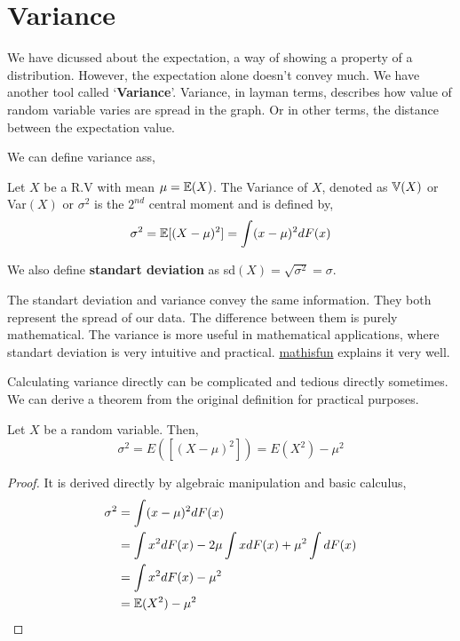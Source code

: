 \section{Variance}
We have dicussed about the expectation, a way of showing a property of a distribution. However, the expectation alone doesn't convey much. We have another tool called `\textbf{Variance}'.
Variance, in layman terms, describes how value of random variable varies are spread in the graph. Or in other terms, the distance between the expectation value. 
\par

We can define variance ass,
\begin{definition}
    Let $X$ be a R.V with mean $\mu = {\mathbb{E}}(X)$. The Variance of $X$, denoted as ${\mathbb{V}}(X)$ or  Var$(X)$ or $\sigma ^2$ is the $2^{nd}$ central moment and is defined by,
    \[ \sigma^2 = {\mathbb{E}} [(X- \mu)^2] = \int (x -\mu)^2 dF(x)\]
    
    We also define \textbf{standart deviation} as sd$(X) = \sqrt{\sigma^2}= \sigma$.
\end{definition}
The standart deviation and variance convey the same information. They both represent the spread of our data. 
The difference between them is purely mathematical. The variance is more useful in mathematical applications, where standart deviation is very intuitive and practical. 
\href{https://www.mathsisfun.com/data/standard-deviation.html}{mathisfun} explains it very well.
\par
Calculating variance directly can be complicated  and tedious directly sometimes. We can derive a theorem from the original definition for practical purposes.
\begin{theorem}
    Let $X$ be a random variable. Then,
    \[\sigma^2 = E([ (X-\mu)^2]) = E(X^2) - \mu^2\]
    \begin{proof}
        It is derived directly by algebraic manipulation and basic calculus,
        \begin{align*}
            \sigma^2 &= \int (x- \mu)^2 dF(x)  \\
                     &= \int x^2 dF(x) -2\mu \int x dF(x) + \mu^2 \int dF(x) \\
                     &= \int x^2 dF(x) - \mu^2 \\
                     &= {\mathbb{E}}(X^2) - \mu^2
        \end{align*}
    \end{proof}
\end{theorem}

